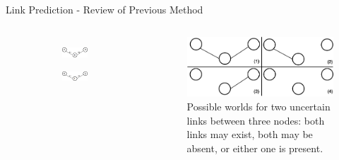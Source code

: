 \documentclass[9pt]{beamer}
\begin{document}
\begin{frame}{Link Prediction - Review of Previous Method}
 \begin{columns}[T,onlytextwidth]
      \begin{figure}
      \centering
      
      \begin{subfigure}[b]{\textwidth}
         \includegraphics[scale = 0.2]{common_neighbor_2.png}
      \end{subfigure}

      \begin{subfigure}[b]{\textwidth}
         \includegraphics[scale = 0.2]{common_neighbor_1.png}
      \end{subfigure}

      \label{example}
      \end{figure}

    
    \begin{figure}
    \includegraphics[scale = 0.18]{possible_world.png}
    \centering
    \caption{Possible worlds for two uncertain links between three nodes: both links may exist, both may be absent, or either one is present.}
    \label{example}
    \end{figure}
    

\end{columns}
\end{frame}
\end{document}
